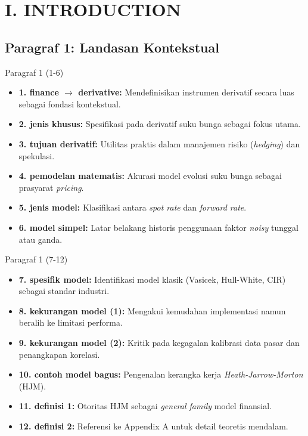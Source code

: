 \section{I. INTRODUCTION}

\subsection{Paragraf 1: Landasan Kontekstual}
\begin{frame}{Paragraf 1 (1-6)}
    \begin{itemize}
        \item \textbf{1. finance $\to$ derivative:} Mendefinisikan instrumen derivatif secara luas sebagai fondasi kontekstual.
        \item \textbf{2. jenis khusus:} Spesifikasi pada derivatif suku bunga sebagai fokus utama.
        \item \textbf{3. tujuan derivatif:} Utilitas praktis dalam manajemen risiko (\textit{hedging}) dan spekulasi.
        \item \textbf{4. pemodelan matematis:} Akurasi model evolusi suku bunga sebagai prasyarat \textit{pricing}.
        \item \textbf{5. jenis model:} Klasifikasi antara \textit{spot rate} dan \textit{forward rate}.
        \item \textbf{6. model simpel:} Latar belakang historis penggunaan faktor \textit{noisy} tunggal atau ganda.
    \end{itemize}
\end{frame}

\begin{frame}{Paragraf 1 (7-12)}
    \begin{itemize}
        \item \textbf{7. spesifik model:} Identifikasi model klasik (Vasicek, Hull-White, CIR) sebagai standar industri.
        \item \textbf{8. kekurangan model (1):} Mengakui kemudahan implementasi namun beralih ke limitasi performa.
        \item \textbf{9. kekurangan model (2):} Kritik pada kegagalan kalibrasi data pasar dan penangkapan korelasi.
        \item \textbf{10. contoh model bagus:} Pengenalan kerangka kerja \textit{Heath-Jarrow-Morton} (HJM).
        \item \textbf{11. definisi 1:} Otoritas HJM sebagai \textit{general family} model finansial.
        \item \textbf{12. definisi 2:} Referensi ke Appendix A untuk detail teoretis mendalam.
    \end{itemize}
\end{frame}

